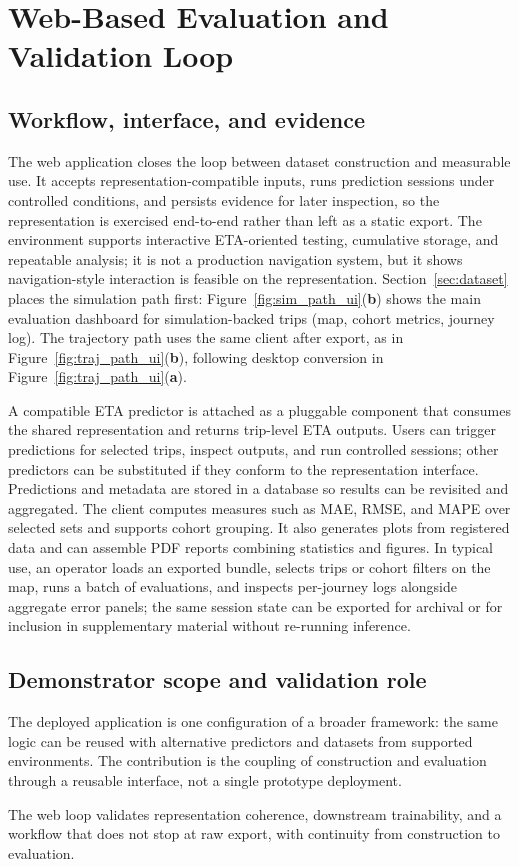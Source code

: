 \section{Web-Based Evaluation and Validation Loop}\label{sec:web}

\subsection{Workflow, interface, and evidence}
The web application closes the loop between dataset construction and measurable use.
It accepts representation-compatible inputs, runs prediction sessions under controlled conditions, and persists evidence for later inspection, so the representation is exercised end-to-end rather than left as a static export.
The environment supports interactive ETA-oriented testing, cumulative storage, and repeatable analysis; it is not a production navigation system, but it shows navigation-style interaction is feasible on the representation.
Section~\ref{sec:dataset} places the simulation path first: Figure~\ref{fig:sim_path_ui}(\textbf{b}) shows the main evaluation dashboard for simulation-backed trips (map, cohort metrics, journey log).
The trajectory path uses the same client after export, as in Figure~\ref{fig:traj_path_ui}(\textbf{b}), following desktop conversion in Figure~\ref{fig:traj_path_ui}(\textbf{a}).

A compatible ETA predictor is attached as a pluggable component that consumes the shared representation and returns trip-level ETA outputs. Users can trigger predictions for selected trips, inspect outputs, and run controlled sessions; other predictors can be substituted if they conform to the representation interface. Predictions and metadata are stored in a database so results can be revisited and aggregated. The client computes measures such as MAE, RMSE, and MAPE over selected sets and supports cohort grouping. It also generates plots from registered data and can assemble PDF reports combining statistics and figures.
In typical use, an operator loads an exported bundle, selects trips or cohort filters on the map, runs a batch of evaluations, and inspects per-journey logs alongside aggregate error panels; the same session state can be exported for archival or for inclusion in supplementary material without re-running inference.

\subsection{Demonstrator scope and validation role}
The deployed application is one configuration of a broader framework: the same logic can be reused with alternative predictors and datasets from supported environments. The contribution is the coupling of construction and evaluation through a reusable interface, not a single prototype deployment.

The web loop validates representation coherence, downstream trainability, and a workflow that does not stop at raw export, with continuity from construction to evaluation.

